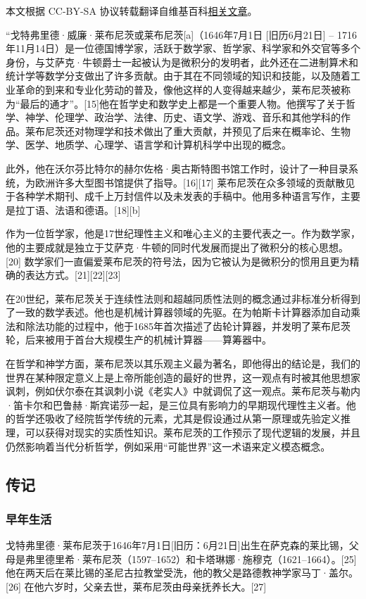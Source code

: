 
本文根据 CC-BY-SA 协议转载翻译自维基百科\href{https://en.wikipedia.org/wiki/Gottfried_Wilhelm_Leibniz}{相关文章}。

“戈特弗里德·威廉·莱布尼茨或莱布尼茨[a]（1646年7月1日 [旧历6月21日] – 1716年11月14日）是一位德国博学家，活跃于数学家、哲学家、科学家和外交官等多个身份，与艾萨克·牛顿爵士一起被认为是微积分的发明者，此外还在二进制算术和统计学等数学分支做出了许多贡献。由于其在不同领域的知识和技能，以及随着工业革命的到来和专业化劳动的普及，像他这样的人变得越来越少，莱布尼茨被称为“最后的通才”。[15]他在哲学史和数学史上都是一个重要人物。他撰写了关于哲学、神学、伦理学、政治学、法律、历史、语文学、游戏、音乐和其他学科的作品。莱布尼茨还对物理学和技术做出了重大贡献，并预见了后来在概率论、生物学、医学、地质学、心理学、语言学和计算机科学中出现的概念。

此外，他在沃尔芬比特尔的赫尔佐格·奥古斯特图书馆工作时，设计了一种目录系统，为欧洲许多大型图书馆提供了指导。[16][17] 莱布尼茨在众多领域的贡献散见于各种学术期刊、成千上万封信件以及未发表的手稿中。他用多种语言写作，主要是拉丁语、法语和德语。[18][b]

作为一位哲学家，他是17世纪理性主义和唯心主义的主要代表之一。作为数学家，他的主要成就是独立于艾萨克·牛顿的同时代发展而提出了微积分的核心思想。[20] 数学家们一直偏爱莱布尼茨的符号法，因为它被认为是微积分的惯用且更为精确的表达方式。[21][22][23]

在20世纪，莱布尼茨关于连续性法则和超越同质性法则的概念通过非标准分析得到了一致的数学表述。他也是机械计算器领域的先驱。在为帕斯卡计算器添加自动乘法和除法功能的过程中，他于1685年首次描述了齿轮计算器，并发明了莱布尼茨轮，后来被用于首台大规模生产的机械计算器——算筹器中。

在哲学和神学方面，莱布尼茨以其乐观主义最为著名，即他得出的结论是，我们的世界在某种限定意义上是上帝所能创造的最好的世界，这一观点有时被其他思想家讽刺，例如伏尔泰在其讽刺小说《老实人》中就调侃了这一观点。莱布尼茨与勒内·笛卡尔和巴鲁赫·斯宾诺莎一起，是三位具有影响力的早期现代理性主义者。他的哲学还吸收了经院哲学传统的元素，尤其是假设通过从第一原理或先验定义推理，可以获得对现实的实质性知识。莱布尼茨的工作预示了现代逻辑的发展，并且仍然影响着当代分析哲学，例如采用“可能世界”这一术语来定义模态概念。
\subsection{传记}
\subsubsection{早年生活}
戈特弗里德·莱布尼茨于1646年7月1日[旧历：6月21日]出生在萨克森的莱比锡，父母是弗里德里希·莱布尼茨（1597–1652）和卡塔琳娜·施穆克（1621–1664）。[25] 他在两天后在莱比锡的圣尼古拉教堂受洗，他的教父是路德教神学家马丁·盖尔。[26] 在他六岁时，父亲去世，莱布尼茨由母亲抚养长大。[27]

